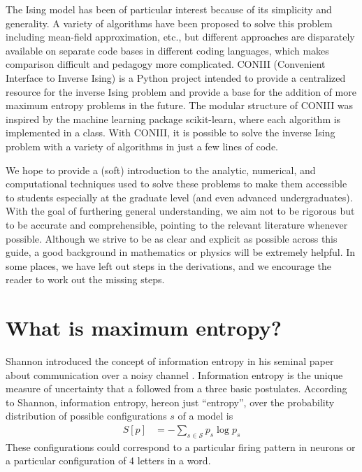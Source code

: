 \documentclass[aps,prl,twocolumn]{revtex4-1}
\begin{document}
The Ising model has been of particular interest because of its simplicity and generality. A variety of algorithms have been proposed to solve this problem including mean-field approximation, etc., but different approaches are disparately available on separate code bases in different coding languages, which makes comparison difficult and pedagogy more complicated.
CONIII (Convenient Interface to Inverse Ising) is a Python project intended to provide a centralized resource for the inverse Ising problem and provide a base for the addition of more maximum entropy problems in the future. 
The modular structure of CONIII was inspired by the machine learning package scikit-learn, where each algorithm is implemented in a class.
With CONIII, it is possible to solve the inverse Ising problem with a variety of algorithms in just a few lines of code.

We hope to provide a (soft) introduction to the analytic, numerical, and computational techniques used to solve these problems to make them accessible to students especially at the graduate level (and even advanced undergraduates). With the goal of furthering general understanding, we aim not to be rigorous but to be accurate and comprehensible, pointing to the relevant literature whenever possible. Although we strive to be as clear and explicit as possible across this guide, a good background in mathematics or physics will be extremely helpful. In some places, we have left out steps in the derivations, and we encourage the reader to work out the missing steps.

\section{What is maximum entropy?}
Shannon introduced the concept of information entropy in his seminal paper about communication over a noisy channel \cite{Shannon:1948wk}. Information entropy is the unique measure of uncertainty that a followed from a three basic postulates. According to Shannon, information entropy, hereon just ``entropy'', over the probability distribution of possible configurations $s$ of a model is
\begin{align}
	S[p] &= -\sum_{s\in \mathcal{S}} p_s \log p_s
\end{align}
These configurations could correspond to a particular firing pattern in neurons or a particular configuration of 4 letters in a word.
\end{document}
